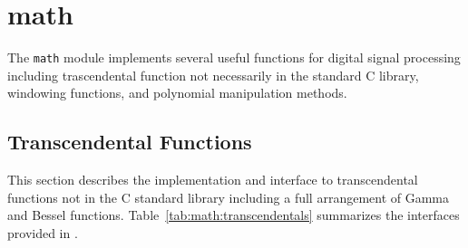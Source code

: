 % 
%

\newpage
\section{math}
\label{module:math}
The {\tt math} module implements several useful functions for digital
signal processing including trascendental function not necessarily in
the standard C library,
windowing functions,
and polynomial manipulation methods.

\subsection{Transcendental Functions}
\label{module:math:transcendentals}
This section describes the implementation and interface to
transcendental functions not in the C standard library
including a full arrangement of Gamma and Bessel functions.
Table~\ref{tab:math:transcendentals} summarizes the interfaces provided
in \liquid.

